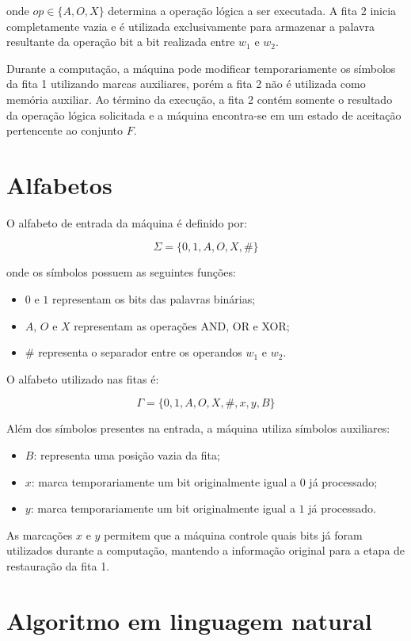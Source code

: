 \documentclass[report, 12pt]{uftreport}
\begin{document}
onde $op \in \{A,O,X\}$ determina a operação lógica a ser executada. A fita 2
inicia completamente vazia e é utilizada exclusivamente para armazenar a
palavra resultante da operação bit a bit realizada entre $w_1$ e $w_2$.

Durante a computação, a máquina pode modificar temporariamente os símbolos da
fita 1 utilizando marcas auxiliares, porém a fita 2 não é utilizada como
memória auxiliar. Ao término da execução, a fita 2 contém somente o resultado
da operação lógica solicitada e a máquina encontra-se em um estado de
aceitação pertencente ao conjunto $F$.


\section{Alfabetos}

O alfabeto de entrada da máquina é definido por:

\[
\Sigma=\{0,1,A,O,X,\#\}
\]

onde os símbolos possuem as seguintes funções:

\begin{itemize}
    \item $0$ e $1$ representam os bits das palavras binárias;
    \item $A$, $O$ e $X$ representam as operações AND, OR e XOR;
    \item $\#$ representa o separador entre os operandos $w_1$ e $w_2$.
\end{itemize}


O alfabeto utilizado nas fitas é:

\[
\Gamma=\{0,1,A,O,X,\#,x,y,B\}
\]

Além dos símbolos presentes na entrada, a máquina utiliza símbolos auxiliares:

\begin{itemize}
    \item $B$: representa uma posição vazia da fita;
    \item $x$: marca temporariamente um bit originalmente igual a $0$ já
    processado;
    \item $y$: marca temporariamente um bit originalmente igual a $1$ já
    processado.
\end{itemize}

As marcações $x$ e $y$ permitem que a máquina controle quais bits já foram
utilizados durante a computação, mantendo a informação original para a etapa
de restauração da fita 1.


\section{Algoritmo em linguagem natural}
\end{document}
